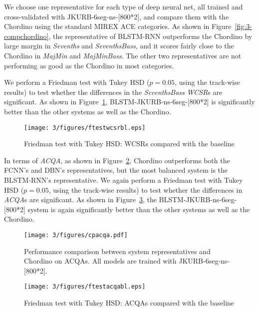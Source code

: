 We choose one representative for each type of deep neural net, all trained and cross-validated with JKURB-6seg-ns-[800*2], and compare them with the Chordino using the standard MIREX ACE categories. As shown in Figure~\ref{fig:3-compchordino}, the representative of BLSTM-RNN outperforms the Chordino by large margin in \textit{Sevenths} and \textit{SeventhsBass}, and it scores fairly close to the Chordino in \textit{MajMin} and \textit{MajMinBass}. The other two representatives are not performing as good as the Chordino in most categories.

We perform a Friedman test with Tukey HSD ($p=0.05$, using the track-wise results) to test whether the differences in the \textit{SeventhsBass} \textit{WCSR}s are significant. As shown in Figure~\ref{fig:3-friedmanwcsrbl}, BLSTM-JKURB-ns-6seg-[800*2] is significantly better than the other systems as well as the Chordino.
\begin{figure}[h!]
	\centering
	\texttt{[image: 3/figures/ftestwcsrbl.eps]}
	\caption{Friedman test with Tukey HSD: WCSRs compared with the baseline}
	\label{fig:3-friedmanwcsrbl}
\end{figure}

In terms of \textit{ACQA}, as shown in Figure~\ref{fig:3-acqachordino}, Chordino outperforms both the FCNN's and DBN's representatives, but the most balanced system is the BLSTM-RNN's representative. We again perform a Friedman test with Tukey HSD ($p=0.05$, using the track-wise results) to test whether the differences in \textit{ACQA}s are significant. As shown in Figure~\ref{fig:3-friedmanacqabl}, the BLSTM-JKURB-ns-6seg-[800*2] system is again significantly better than the other systems as well as the Chordino.
\begin{figure}[h!]
	\centering
	\texttt{[image: 3/figures/cpacqa.pdf]}
	\caption{Performance comparison between system representatives and Chordino on ACQAs. All models are trained with JKURB-6seg-ns-[800*2].}
	\label{fig:3-acqachordino}
\end{figure}
\begin{figure}[h!]
	\centering
	\texttt{[image: 3/figures/ftestacqabl.eps]}
	\caption{Friedman test with Tukey HSD: ACQAs compared with the baseline}
	\label{fig:3-friedmanacqabl}
\end{figure}

